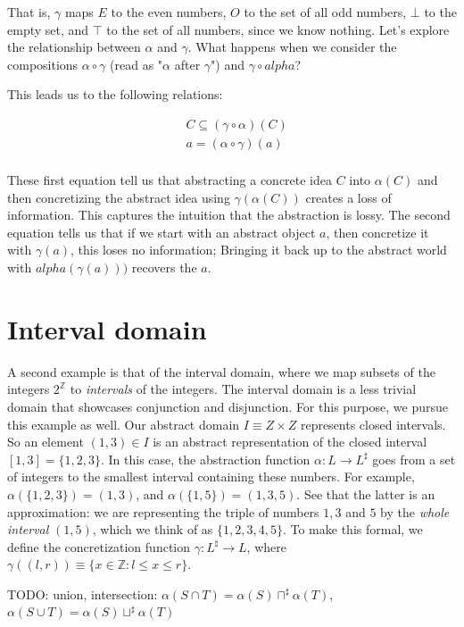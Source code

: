 \documentclass[11pt]{book}
\newcommand{\Z}{\ensuremath{\mathbb Z}}
\begin{document}
That is, $\gamma$ maps $E$ to the even numbers, $O$ to the set of all odd numbers, $\bot$ to the empty set, and $\top$ to the set of all numbers, since we know nothing. Let's explore the relationship between $\alpha$ and $\gamma$. What happens  when we consider the compositions $\alpha \circ \gamma$ (read as "$\alpha$ after $\gamma$") and $\gamma \circ alpha$?

This leads us to the following relations:

\begin{align*}
	&C \subseteq (\gamma\circ \alpha)(C) \\
	&a = (\alpha \circ \gamma)(a) \\
\end{align*}

These first equation tell us that abstracting a concrete idea $C$ into $\alpha(C)$ and then
concretizing the abstract idea using $\gamma(\alpha(C))$ creates a loss of information. This captures the intuition that the abstraction is lossy. The second equation tells us that if we start with an abstract object $a$, then concretize it with $\gamma(a)$, this loses no information; Bringing it back up to the abstract world with $alpha(\gamma(a)))$ recovers the $a$. 
\section{Interval domain}


A second example is that of the interval domain, where we map subsets of the integers $2^\Z$ to \emph{intervals} of the integers. The interval domain is a less trivial domain that showcases conjunction and disjunction. For this purpose, we pursue this example as well.
Our abstract domain $I \equiv Z \times Z$ represents closed intervals. So an element
$(1, 3) \in I$ is an abstract representation of the closed interval $[1, 3] = \{ 1, 2, 3 \}$.
In this case, the abstraction function $\alpha: L \rightarrow L^\sharp$ goes from a set of integers to the smallest interval containing these numbers. For example, $\alpha(\{1, 2, 3\}) = (1, 3)$, and $\alpha(\{1, 5\}) = (1, 3, 5)$. See that the latter is an approximation: we are representing the triple of numbers $1, 3$ and $5$ by the \emph{whole interval} $(1, 5)$, which we think of as $\{1, 2, 3, 4, 5\}$. To make this formal, we define the concretization function $\gamma: L^\sharp \rightarrow L$, where $\gamma((l, r)) \equiv \{ x \in \mathbb Z : l \leq x \leq r \}$.


TODO: union, intersection: $\alpha(S \cap T) = \alpha(S) \sqcap^\sharp \alpha(T)$, $\alpha(S \cup T) = \alpha(S) \sqcup^\sharp \alpha(T)$
\end{document}
